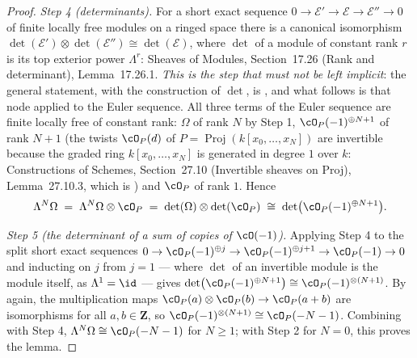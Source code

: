 \begin{proof}
\emph{Step 4 (determinants).}  For a short exact sequence
$0\to\mathcal E'\to\mathcal E\to\mathcal E''\to0$ of finite locally
free modules on a ringed space there is a canonical isomorphism
$\det(\mathcal E')\otimes\det(\mathcal E'')\cong\det(\mathcal E)$,
where $\det$ of a module
of constant rank $r$ is its top exterior power $\Lambda^{r}$: Sheaves
of Modules, Section~17.26 (Rank and determinant), Lemma~17.26.1.
\emph{This is the step that must not be left
implicit}: the general statement, with the construction of $\det$, is
, and what follows is that node
applied to the Euler sequence.  All three terms of the
Euler sequence are finite locally free of constant rank: $\Omega$ of
rank $N$ by Step 1, $\cO_P(-1)^{\oplus N+1}$ of rank $N+1$ (the
twists $\cO_P(d)$ of $P=\operatorname{Proj}(k[x_0,\dots,x_N])$ are
invertible because the graded ring $k[x_0,\dots,x_N]$ is generated in
degree $1$ over $k$: Constructions of Schemes, Section~27.10
(Invertible sheaves on Proj), Lemma~27.10.3, which is
) and
$\cO_P$ of rank $1$.  Hence
\[
\Lambda^{N}\Omega\;=\;\Lambda^{N}\Omega\otimes\cO_P
\;=\;\det(\Omega)\otimes\det(\cO_P)
\;\cong\;\det\bigl(\cO_P(-1)^{\oplus N+1}\bigr).
\]

\emph{Step 5 (the determinant of a sum of copies of $\cO(-1)$).}
Applying Step 4 to the split short exact sequences
$0\to\cO_P(-1)^{\oplus j}\to\cO_P(-1)^{\oplus j+1}\to\cO_P(-1)\to0$
and inducting on $j$ from $j=1$ --- where $\det$ of an invertible
module is the module itself, as $\Lambda^{1}=\id$ ---
gives
$\det\bigl(\cO_P(-1)^{\oplus N+1}\bigr)\cong\cO_P(-1)^{\otimes(N+1)}$.
By  again, the multiplication maps
$\cO_P(a)\otimes\cO_P(b)\to\cO_P(a+b)$ are isomorphisms for all
$a,b\in\mathbf Z$, so $\cO_P(-1)^{\otimes(N+1)}\cong\cO_P(-N-1)$.
Combining with Step 4, $\Lambda^{N}\Omega\cong\cO_P(-N-1)$ for
$N\ge1$; with Step 2 for $N=0$, this proves the lemma.
\end{proof}

